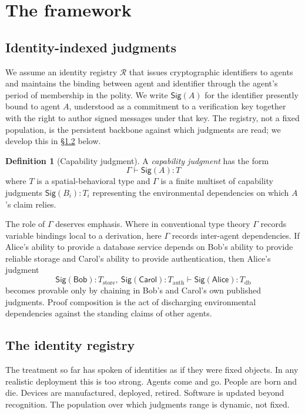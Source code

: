 \documentclass[11pt]{article}
\theoremstyle{definition}
\newtheorem{definition}{Definition}[section]
\theoremstyle{plain}
\theoremstyle{remark}
\newcommand{\Sig}{\mathsf{Sig}}
\newcommand{\Alice}{\mathsf{Alice}}
\newcommand{\Bob}{\mathsf{Bob}}
\begin{document}
\section{The framework}\label{sec:framework}

\subsection{Identity-indexed judgments}

We assume an identity registry $\mathcal{R}$ that issues cryptographic identifiers to agents and maintains the binding between agent and identifier through the agent's period of membership in the polity. We write $\Sig(A)$ for the identifier presently bound to agent $A$, understood as a commitment to a verification key together with the right to author signed messages under that key. The registry, not a fixed population, is the persistent backbone against which judgments are read; we develop this in \S\ref{ssec:registry} below.

\begin{definition}[Capability judgment]
A \emph{capability judgment} has the form
\[
\Gamma \vdash \Sig(A) : T
\]
where $T$ is a spatial-behavioral type and $\Gamma$ is a finite multiset of capability judgments $\Sig(B_i) : T_i$ representing the environmental dependencies on which $A$'s claim relies.
\end{definition}

The role of $\Gamma$ deserves emphasis. Where in conventional type theory $\Gamma$ records variable bindings local to a derivation, here $\Gamma$ records inter-agent dependencies. If Alice's ability to provide a database service depends on Bob's ability to provide reliable storage and Carol's ability to provide authentication, then Alice's judgment
\[
\Sig(\Bob):T_{\text{store}},\ \Sig(\mathsf{Carol}):T_{\text{auth}} \vdash \Sig(\Alice) : T_{\text{db}}
\]
becomes provable only by chaining in Bob's and Carol's own published judgments. Proof composition is the act of discharging environmental dependencies against the standing claims of other agents.

\subsection{The identity registry}\label{ssec:registry}

The treatment so far has spoken of identities as if they were fixed objects. In any realistic deployment this is too strong. Agents come and go. People are born and die. Devices are manufactured, deployed, retired. Software is updated beyond recognition. The population over which judgments range is dynamic, not fixed.
\end{document}
